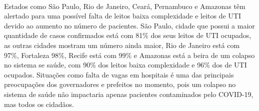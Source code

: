 \documentclass[11pt]{article}
\begin{document}
    \begin{center}
    \end{center}
    { \hspace*{\fill} \\}
    
    Estados como São Paulo, Rio de Janeiro, Ceará, Pernambuco e Amazonas têm
alertado para uma possível falta de leitos baixa complexidade e leitos
de UTI devido ao aumento no número de pacientes. São Paulo, cidade que
possui a maior quantidade de casos confirmados está com 81\% dos seus
leitos de UTI ocupados, as outras cidades mostram um número ainda maior,
Rio de Janeiro está com 97\%, Fortaleza 98\%, Recife está com 99\% e
Amazonas está a beira de um colapso no sistema se saúde, com 90\% dos
leitos baixa complexidade e 96\% dos de UTI ocupados. Situações como
falta de vagas em hospitais é uma das principais preocupações dos
governadores e prefeitos no momento, pois um colapso no sistema de saúde
não impactaria apenas pacientes contaminados pelo COVID-19, mas todos os
cidadãos.
\end{document}
